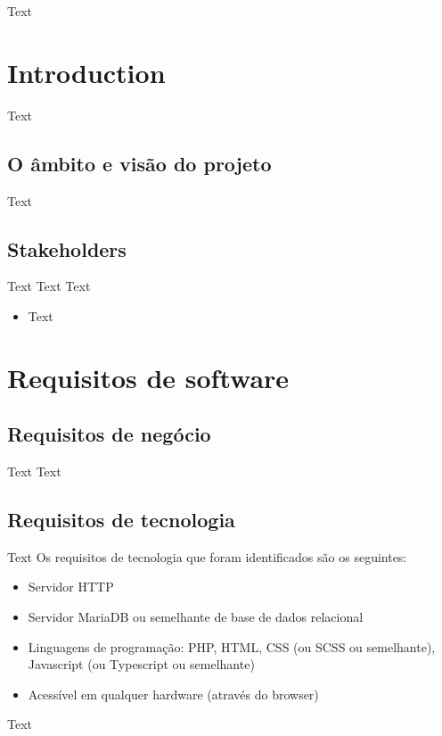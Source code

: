 \documentclass{scrreprt}
\begin{document}
Text

\chapter{Introduction}

Text

\section{O âmbito e visão do projeto}

Text

\section{Stakeholders}

Text
\newline
Text
\newline
Text
\begin{itemize}
    \item Text
\end{itemize}

\chapter{Requisitos de software}

\section{Requisitos de negócio}

Text
\newline
Text

\section{Requisitos de tecnologia}

Text
\newline
Os requisitos de tecnologia que foram identificados são os seguintes:
\begin{itemize}
    \item Servidor HTTP
    \item Servidor MariaDB ou semelhante de base de dados relacional
    \item Linguagens de programação: PHP, HTML, CSS (ou SCSS ou semelhante), Javascript (ou Typescript ou semelhante)
    \item Acessível em qualquer hardware (através do browser)
\end{itemize}
Text
\end{document}
